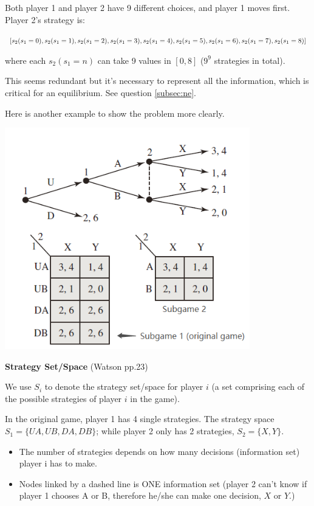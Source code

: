 \documentclass{article}
\begin{document}
Both player 1 and player 2 have 9 different choices, and player 1 moves first.
Player 2's strategy is:

$[s_2(s_1 = 0), s_2(s_1 = 1), s_2(s_1 = 2), s_2(s_1 = 3), s_2(s_1 = 4), s_2(s_1 = 5),
 \\ s_2(s_1 = 6), s_2(s_1 = 7), s_2(s_1 = 8)]$

where each $s_2(s_1 = n)$ can take 9 values in $[0,8]$ ($9^9$ strategies in total).


\begin{mdframed}[backgroundcolor=blue!20,linecolor=white]
This seems redundant but it's necessary to represent all the information, which is critical for an equilibrium. See question \ref{subsec:ne}.

\medskip 

Here is another example to show the problem more clearly.


\begin{center}
{\includegraphics[width=0.8\textwidth]{7.f15_4}
\label{fig:f15_4}}
\vspace{2mm}
\end{center}

\textbf{Strategy Set/Space} (Watson pp.23)

We use $S_i$ to denote the strategy set/space for player $i$ (a set comprising each of the possible strategies of player $i$ in the game).

\medskip 

In the original game, player 1 has 4 single strategies. The strategy space $S_1 = \{UA,UB,DA,DB\}$; while player 2 only has 2 strategies, $S_2 = \{X,Y\}$.

\begin{itemize}
\item The number of strategies depends on how many decisions (information set) player i has to make.
\item Nodes linked by a dashed line is ONE information set (player 2 can't know if player 1 chooses A or B, therefore he/she can make one decision, $X$ or $Y$.)

\end{itemize}

\end{mdframed}
\end{document}
